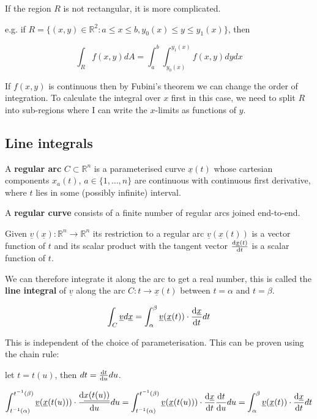 \begin{remark}
	If the region $R$ is not rectangular, it is more complicated.
	
	e.g. if $R = \{(x, y) \in \mathbb{R}^2: a \le x \le b, y_0(x) \le y \le y_1(x)\}$, then
	
	\[\int_R f(x, y) dA = \int_a^b \int_{y_0(x)}^{y_1(x)} f(x, y) dy dx\]

	If $f(x, y)$ is continuous then by Fubini's theorem we can change the order of integration. To calculate the integral over $x$ first in this case, we need to split $R$ into sub-regions where I can write the $x$-limits as functions of $y$.
\end{remark}

\subsection{Line integrals}

\begin{definition}
	A \textbf{regular arc} $C \subset \mathbb{R}^n$ is a parameterised curve $\underline{x}(t)$ whose cartesian components $x_a(t)$, $a \in \{1, \dots, n\}$ are continuous with continuous first derivative, where $t$ lies in some (possibly infinite) interval.	
\end{definition}

\begin{definition}
	A \textbf{regular curve} consists of a finite number of regular arcs joined end-to-end.
\end{definition}

Given $\underline{v}(\underline{x}): \mathbb{R}^n \rightarrow \mathbb{R}^n$ its restriction to a regular arc $\underline{v}(\underline{x}(t))$ is a vector function of $t$ and its scalar product with the tangent vector $\diff{\underline{x}(t)}{t}$ is a scalar function of $t$.

We can therefore integrate it along the arc to get a real number, this is called the \textbf{line integral} of $\underline{v}$ along the arc $C: t \rightarrow \underline{x}(t)$ between $t = \alpha$ and $t = \beta$.

\[\int_C \underline{v} d\underline{x} = \int_{\alpha}^{\beta} \underline{v}(\underline{x}(t)) \cdot \diff{\underline{x}}{t} dt\]

This is independent of the choice of parameterisation. This can be proven using the chain rule:

let $t = t(u)$, then $dt = \diff{t}{u} du$.

\[\int_{t^{-1}(\alpha)}^{t^{-1}(\beta)} \underline{v}(\underline{x}(t(u))) \cdot \diff{\underline{x(t(u))}}{u} du = \int_{t^{-1}(\alpha)}^{t^{-1}(\beta)} \underline{v}(\underline{x}(t(u))) \cdot \diff{\underline{x}}{t} \diff{t}{u} du = \int_{\alpha}^{\beta} \underline{v}(\underline{x}(t)) \cdot \diff{\underline{x}}{t} dt\]

